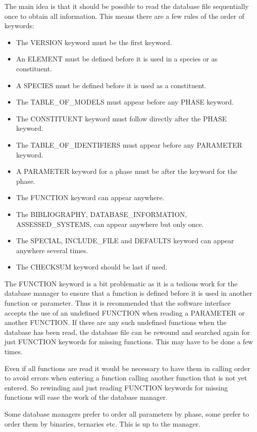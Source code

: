 \documentclass[12pt]{article}
\begin{document}
The main idea is that it should be possible to read the database file
sequentially once to obtain all information.  This means there are a
few rules of the order of keywords:
\begin{itemize}
\item The VERSION keyword must be the first keyword.
\item An ELEMENT must be defined before it is used in a species or as
constituent.
\item A SPECIES must be defined before it is used as a constituent.
\item The TABLE\_OF\_MODELS must appear before any PHASE keyword.
\item The CONSTITUENT keyword must follow directly after the PHASE
  keyword.
\item The TABLE\_OF\_IDENTIFIERS must appear before any PARAMETER
  keyword.
\item A PARAMETER keyword for a phase must be after the keyword for
  the phase.
\item The FUNCTION keyword can appear anywhere.
\item The BIBLIOGRAPHY, DATABASE\_INFORMATION, 
  ASSESSED\_SYSTEMS, can appear anywhere but only once.
\item The SPECIAL, INCLUDE\_FILE and DEFAULTS keyword can appear
  anywhere several times.
\item The CHECKSUM keyword should be last if used.
\end{itemize}

The FUNCTION keyword is a bit problematic as it is a tedious work for
the database manager to ensure that a function is defined before it is
used in another function or parameter.  Thus it is recommended that
the software interface accepts the use of an undefined FUNCTION when
reading a PARAMETER or another FUNCTION.  If there are any such
undefined functions when the database has been read, the database file
can be rewound and searched again for just FUNCTION keywords for
missing functions.  This may have to be done a few times.

Even if all functions are read it would be necessary to have them in
calling order to avoid errors when entering a function calling another
function that is not yet entered.  So rewinding and just reading
FUNCTION keywords for missing functions will ease the work of the
database manager.

Some database managers prefer to order all parameters by phase, some
prefer to order them by binaries, ternaries etc.  This is up to the
manager.
\end{document}
